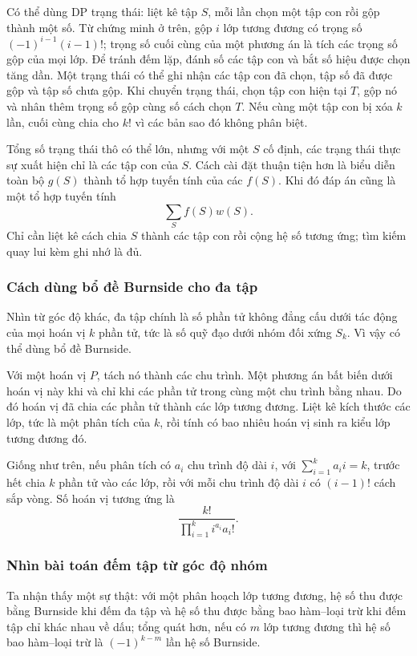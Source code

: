 \documentclass[11pt]{article}
\begin{document}
Có thể dùng DP trạng thái: liệt kê tập \(S\), mỗi lần chọn một tập con rồi gộp
thành một số. Từ chứng minh ở trên, gộp \(i\) lớp tương đương có trọng số
\((-1)^{i-1}(i-1)!\); trọng số cuối cùng của một phương án là tích các trọng số
gộp của mọi lớp. Để tránh đếm lặp, đánh số các tập con và bắt số hiệu được chọn
tăng dần. Một trạng thái có thể ghi nhận các tập con đã chọn, tập số đã được
gộp và tập số chưa gộp. Khi chuyển trạng thái, chọn tập con hiện tại \(T\), gộp
nó và nhân thêm trọng số gộp cùng số cách chọn \(T\). Nếu cùng một tập con bị
xóa \(k\) lần, cuối cùng chia cho \(k!\) vì các bản sao đó không phân biệt.

Tổng số trạng thái thô có thể lớn, nhưng với một \(S\) cố định, các trạng thái
thực sự xuất hiện chỉ là các tập con của \(S\). Cách cài đặt thuận tiện hơn là
biểu diễn toàn bộ \(g(S)\) thành tổ hợp tuyến tính của các \(f(S)\). Khi đó đáp
án cũng là một tổ hợp tuyến tính
\[
  \sum_S f(S)w(S).
\]
Chỉ cần liệt kê cách chia \(S\) thành các tập con rồi cộng hệ số tương ứng; tìm
kiếm quay lui kèm ghi nhớ là đủ.

\subsubsection{Cách dùng bổ đề Burnside cho đa tập}

Nhìn từ góc độ khác, đa tập chính là số phần tử không đẳng cấu dưới tác động
của mọi hoán vị \(k\) phần tử, tức là số quỹ đạo dưới nhóm đối xứng \(S_k\).
Vì vậy có thể dùng bổ đề Burnside.

Với một hoán vị \(P\), tách nó thành các chu trình. Một phương án bất biến dưới
hoán vị này khi và chỉ khi các phần tử trong cùng một chu trình bằng nhau. Do
đó hoán vị đã chia các phần tử thành các lớp tương đương. Liệt kê kích thước
các lớp, tức là một phân tích của \(k\), rồi tính có bao nhiêu hoán vị sinh ra
kiểu lớp tương đương đó.

Giống như trên, nếu phân tích có \(a_i\) chu trình độ dài \(i\), với
\(\sum_{i=1}^{k}a_i i=k\), trước hết chia \(k\) phần tử vào các lớp, rồi với
mỗi chu trình độ dài \(i\) có \((i-1)!\) cách sắp vòng. Số hoán vị tương ứng là
\[
  \frac{k!}{\prod_{i=1}^{k}i^{a_i}a_i!}.
\]

\subsubsection{Nhìn bài toán đếm tập từ góc độ nhóm}

Ta nhận thấy một sự thật: với một phân hoạch lớp tương đương, hệ số thu được
bằng Burnside khi đếm đa tập và hệ số thu được bằng bao hàm--loại trừ khi đếm
tập chỉ khác nhau về dấu; tổng quát hơn, nếu có \(m\) lớp tương đương thì hệ
số bao hàm--loại trừ là \((-1)^{k-m}\) lần hệ số Burnside.
\end{document}
